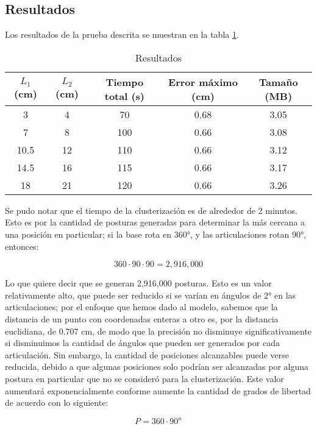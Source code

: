 \subsection{Resultados}

Los resultados de la prueba descrita se muestran en la tabla \ref{tab:Resultados}.

\begin{table}[ht]
	\centering
	\begin{tabular}{|c|c|c|c|c|}
		\hline
		\textbf{$L_1$ (cm)} & \textbf{$L_2$ (cm)} & \textbf{Tiempo total (s)} & \textbf{Error máximo (cm)} & \textbf{Tamaño (MB)} \\
		\hline
		3 & 4 & 70 & 0.68 & 3.05 \\
		7 & 8 & 100 & 0.66 & 3.08 \\
		10.5 & 12 & 110 & 0.66 & 3.12 \\
		14.5 & 16 & 115 & 0.66 & 3.17 \\
		18 & 21 & 120 & 0.66 & 3.26 \\
		\hline
	\end{tabular}
	\caption{Resultados}
	\label{tab:Resultados}
\end{table}

Se pudo notar que el tiempo de la clusterización es de alrededor de 2 minutos. Esto es por la cantidad de posturas generadas para determinar la más cercana a una posición en particular; si la base rota en 360°, y las articulaciones rotan 90°, entonces:

\begin{equation}
	360 \cdot 90 \cdot 90 = 2,916,000
\end{equation}

Lo que quiere decir que se generan 2,916,000 posturas. Esto es un valor relativamente alto, que puede ser reducido si se varían en ángulos de 2° en las articulaciones; por el enfoque que hemos dado al modelo, sabemos que la distancia de un punto con coordenadas enteras a otro es, por la distancia euclidiana, de 0.707 cm, de modo que la precisión no disminuye significativamente si disminuimos la cantidad de ángulos que pueden ser generados por cada articulación. Sin embargo, la cantidad de posiciones alcanzables puede verse reducida, debido a que algunas posiciones solo podrían ser alcanzadas por alguna postura en particular que no se consideró para la clusterización. Este valor aumentará exponencialmente conforme aumente la cantidad de grados de libertad de acuerdo con lo siguiente:

\begin{equation}
	P = 360 \cdot 90^n
\end{equation}

